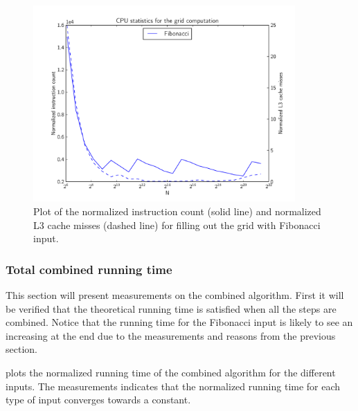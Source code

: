 \documentclass[twoside,11pt,openright]{report}
\begin{document}
\begin{figure}[!htb]
  \centering
  \includegraphics[width=10cm]{combined/grid_runningtime_cpu}
  \caption{Plot of the normalized instruction count (solid line) and normalized L3 cache misses (dashed line) for filling out the grid with Fibonacci input.}
  \label{fig:benchmark:fill-grid-cpu}
\end{figure}

\subsubsection{Total combined running time}
This section will present measurements on the combined algorithm. First it will be verified that the theoretical running time is satisfied when all the steps are combined. Notice that the running time for the Fibonacci input is likely to see an increasing at the end due to the measurements and reasons from the previous section.

 plots the normalized running time of the combined algorithm for the different inputs. The measurements indicates that the normalized running time for each type of input converges towards a constant.
\end{document}
